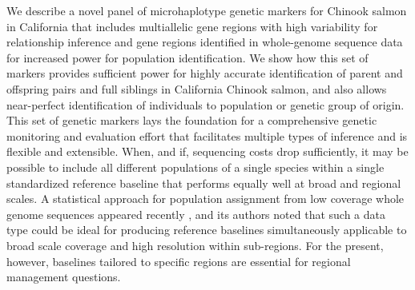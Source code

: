 We describe a novel panel of microhaplotype genetic markers for Chinook salmon 
in California that includes multiallelic gene regions with high variability for 
relationship inference and gene regions identified in whole-genome sequence data 
for increased power for population identification. We show how this set of markers
provides sufficient power for highly accurate identification of parent and offspring
pairs and full siblings in California Chinook salmon, and also allows near-perfect 
identification of individuals to population or genetic group of origin. This set of 
genetic markers lays the foundation for a comprehensive genetic monitoring and evaluation effort
that facilitates multiple types of inference and is flexible and extensible.
When, and if, sequencing costs drop sufficiently, it may be possible to include
all different populations of a single species within a single standardized reference baseline
that performs equally well at broad and regional scales. A statistical approach for population
assignment from low coverage whole genome sequences appeared recently
\citep{desaixINPRESSpopulation}, and its authors noted that such a data type could
be ideal for producing reference baselines simultaneously applicable to broad scale
coverage and high resolution within sub-regions.   For the present, however,
baselines tailored to specific regions are essential for regional management questions.

